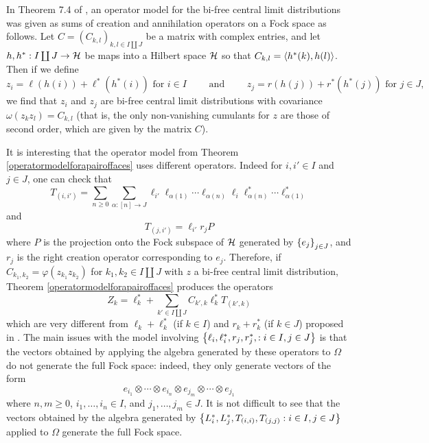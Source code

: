 \begin{remark}
	In Theorem 7.4 of \cite{voiculescu2014free}, an operator model for the bi-free central limit distributions was given as sums of creation and annihilation operators on a Fock space as follows.
	Let $C = (C_{k,l})_{k,l\in I\coprod J}$ be a matrix with complex entries, and let $h, h^* : I \coprod J \to \mathcal{H}$ be maps into a Hilbert space $\mathcal{H}$ so that $C_{k,l} = \left\langle h^*(k), h(l)\right\rangle$.
	Then if we define
	$$z_i = \ell(h(i)) + \ell^*(h^*(i)) \text{ for } i \in I \qquad\text{ and }\qquad
	z_j = r(h(j)) + r^*(h^*(j)) \text{ for } j \in J,$$
	we find that $z_i$ and $z_j$ are bi-free central limit distributions with covariance $\omega(z_kz_l) = C_{k,l}$ (that is, the only non-vanishing cumulants for $z$ are those of second order, which are given by the matrix $C$).

	It is interesting that the operator model from Theorem \ref{operatormodelforapairoffaces} uses different operators.
	Indeed for $i, i' \in I$ and $j \in J$, one can check that
	\[
		T_{(i,i')} = \sum_{n\geq 0} \sum_{\alpha : [n] \to J} \ell_{i'}\ell_{\alpha(1)} \cdots \ell_{\alpha(n)} \ell_{i} \ell^*_{\alpha(n)} \cdots \ell^*_{\alpha(1)}
	\]
	and
	\[
		T_{(j,i')} = \ell_{i'}r_j P
	\]
	where $P$ is the projection onto the Fock subspace of $\mathcal{H}$ generated by $\left\{e_j\right\}_{j \in J}$, and $r_j$ is the right creation operator corresponding to $e_j$.
	Therefore, if $C_{k_1, k_2} = \varphi(z_{k_1}z_{k_2})$ for $k_1, k_2 \in I \coprod J$ with $z$ a bi-free central limit distribution, Theorem \ref{operatormodelforapairoffaces} produces the operators
	\[
		Z_k = \ell_k^* + \sum_{k' \in I \coprod J} C_{k', k} \ell_{k}^*T_{(k',k)}
	\]
	which are very different from $\ell_k + \ell_k^*$ (if $k \in I$) and $r_k+r_k^*$ (if $k \in J$) proposed in \cite{voiculescu2014free}.
	The main issues with the model involving $\left\{\ell_i, \ell^*_i, r_j, r^*_j, :  i \in I, j \in J\right\}$ is that the vectors obtained by applying the algebra generated by these operators to $\Omega$ do not generate the full Fock space: indeed, they only generate vectors of the form
	\[
		e_{i_1} \otimes \cdots \otimes e_{i_n} \otimes e_{j_m} \otimes \cdots \otimes e_{j_1}
	\]
	where $n,m \geq 0$, $i_1, \ldots, i_n \in I$, and $j_1, \ldots, j_m \in J$.
	It is not difficult to see that the vectors obtained by the algebra generated by $\left\{L_i^*, L_j^*, T_{(i,i)}, T_{(j,j)} : i \in I, j \in J\right\}$ applied to $\Omega$ generate the full Fock space.
\end{remark}











